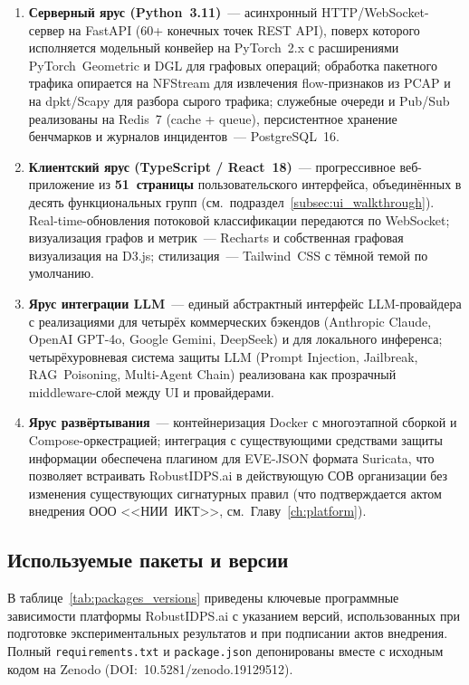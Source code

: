 \begin{enumerate}[leftmargin=2em, itemsep=0.2em]
\item \textbf{Серверный ярус (Python~3.11)}~--- асинхронный
HTTP/WebSocket-сервер на FastAPI (60+ конечных точек REST API),
поверх которого исполняется модельный конвейер на PyTorch~2.x с
расширениями PyTorch~Geometric и DGL для графовых операций;
обработка пакетного трафика опирается на NFStream для
извлечения flow-признаков из PCAP и на dpkt/Scapy для разбора
сырого трафика; служебные очереди и Pub/Sub реализованы на
Redis~7 (cache + queue), персистентное хранение бенчмарков и
журналов инцидентов~--- PostgreSQL~16.

\item \textbf{Клиентский ярус (TypeScript / React~18)}~---
прогрессивное веб-приложение из \textbf{51~страницы}
пользовательского интерфейса, объединённых в десять
функциональных групп (см.~подраздел~\ref{subsec:ui_walkthrough}).
Real-time-обновления потоковой классификации передаются по
WebSocket; визуализация графов и метрик~--- Recharts и собственная
графовая визуализация на D3.js; стилизация~--- Tailwind~CSS с
тёмной темой по умолчанию.

\item \textbf{Ярус интеграции LLM}~--- единый абстрактный
интерфейс LLM-провайдера с реализациями для четырёх
коммерческих бэкендов (Anthropic Claude, OpenAI GPT-4o,
Google Gemini, DeepSeek) и для локального инференса;
четырёхуровневая система защиты LLM (Prompt Injection,
Jailbreak, RAG~Poisoning, Multi-Agent Chain) реализована как
прозрачный middleware-слой между UI и провайдерами.

\item \textbf{Ярус развёртывания}~--- контейнеризация Docker
с многоэтапной сборкой и Compose-оркестрацией; интеграция с
существующими средствами защиты информации обеспечена
плагином для EVE-JSON формата Suricata, что позволяет
встраивать RobustIDPS.ai в действующую СОВ организации без
изменения существующих сигнатурных правил (что подтверждается
актом внедрения ООО <<НИИ~ИКТ>>, см.~Главу~\ref{ch:platform}).

\end{enumerate}

\subsection{Используемые пакеты и версии}
\label{subsec:packages_versions}

В таблице~\ref{tab:packages_versions} приведены ключевые
программные зависимости платформы RobustIDPS.ai с указанием
версий, использованных при подготовке экспериментальных
результатов и при подписании актов внедрения. Полный
\texttt{requirements.txt} и \texttt{package.json} депонированы
вместе с исходным кодом на Zenodo (DOI:~10.5281/zenodo.19129512).

